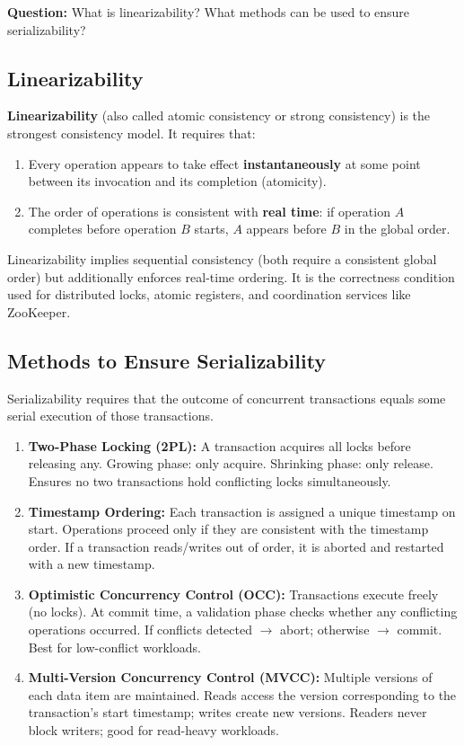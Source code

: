 \documentclass[12pt,a4paper]{article}
\begin{document}
\textbf{Question:} What is linearizability? What methods can be used to ensure serializability?

\subsection*{Linearizability}

\textbf{Linearizability} (also called atomic consistency or strong consistency) is the strongest consistency model. It requires that:
\begin{enumerate}[noitemsep]
  \item Every operation appears to take effect \textbf{instantaneously} at some point between its invocation and its completion (atomicity).
  \item The order of operations is consistent with \textbf{real time}: if operation $A$ completes before operation $B$ starts, $A$ appears before $B$ in the global order.
\end{enumerate}

Linearizability implies sequential consistency (both require a consistent global order) but additionally enforces real-time ordering. It is the correctness condition used for distributed locks, atomic registers, and coordination services like ZooKeeper.

\subsection*{Methods to Ensure Serializability}

Serializability requires that the outcome of concurrent transactions equals some serial execution of those transactions.

\begin{enumerate}
  \item \textbf{Two-Phase Locking (2PL):} A transaction acquires all locks before releasing any. Growing phase: only acquire. Shrinking phase: only release. Ensures no two transactions hold conflicting locks simultaneously.

  \item \textbf{Timestamp Ordering:} Each transaction is assigned a unique timestamp on start. Operations proceed only if they are consistent with the timestamp order. If a transaction reads/writes out of order, it is aborted and restarted with a new timestamp.

  \item \textbf{Optimistic Concurrency Control (OCC):} Transactions execute freely (no locks). At commit time, a validation phase checks whether any conflicting operations occurred. If conflicts detected $\to$ abort; otherwise $\to$ commit. Best for low-conflict workloads.

  \item \textbf{Multi-Version Concurrency Control (MVCC):} Multiple versions of each data item are maintained. Reads access the version corresponding to the transaction's start timestamp; writes create new versions. Readers never block writers; good for read-heavy workloads.
\end{enumerate}
\end{document}
